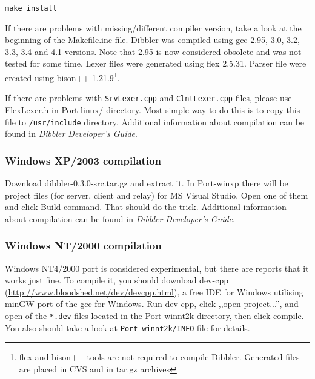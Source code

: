 \begin{verbatim}
make install
\end{verbatim}

If there are problems with missing/different compiler
version, take a look at the beginning of the Makefile.inc
file. Dibbler was compiled using gcc 2.95, 3.0, 3.2, 3.3, 3.4 and 4.1
versions. Note that 2.95 is now considered obsolete and was not tested
for some time. Lexer files were generated using flex 2.5.31. Parser file
were created using bison++ 1.21.9\footnote{flex and bison++ tools are
  not required to compile Dibbler. Generated files are placed in CVS
  and in tar.gz archives}. 

If there are problems with \verb+SrvLexer.cpp+ and
\verb+ClntLexer.cpp+ files, please use FlexLexer.h in Port-linux/
directory. Most simple way to do this is to copy this file to
\verb+/usr/include+ directory. Additional information about
compilation can be found in \emph{Dibbler Developer's Guide}.

\subsubsection{Windows XP/2003 compilation}
Download dibbler-0.3.0-src.tar.gz and extract it. In Port-winxp there
will be project files (for server, client and relay) for MS
Visual Studio. Open one of them and click Build command. That should
do the trick. Additional information about compilation can be found in
\emph{Dibbler Developer's Guide}.

\subsubsection{Windows NT/2000 compilation}
Windows NT4/2000 port is considered experimental, but there are reports
that it works just fine. To compile it, you should download dev-cpp
(\url{http://www.bloodshed.net/dev/devcpp.html}), a free IDE for
Windows utilising minGW port of the gcc for Windows. Run dev-cpp,
click ,,open project...'', and open of the \verb+*.dev+ files located
in the Port-winnt2k directory, then click compile. You also should
take a look at \verb+Port-winnt2k/INFO+ file for details.
